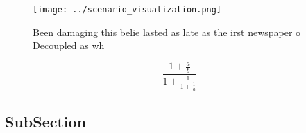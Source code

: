 \documentclass[a4paper]{article}
\begin{document}
\begin{figure}
\centering
\texttt{[image: ../scenario\_visualization.png]}
\caption{Been damaging this belie lasted as late as the irst newspaper o Decoupled as wh
}
\end{figure}
 
\[ \frac{1+\frac{a}{b}}{1+\frac{1}{1+\frac{1}{a}}} \]

\subsection{SubSection}
\end{document}
